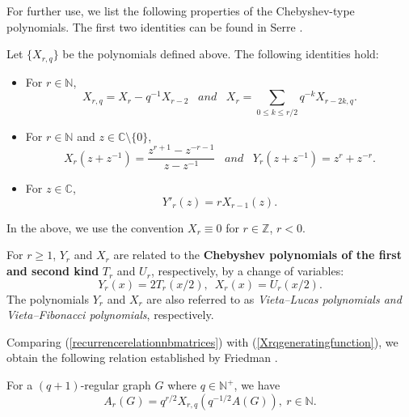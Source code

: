 \documentclass{article}
\begin{document}
For further use, we list the following properties of the Chebyshev-type polynomials. The first two identities can be found in Serre \cite{Ser97}.
\begin{lemma}\label{propertyofcheby}
Let $\{X_{r,q}\}$ be the polynomials defined above. The following identities hold:
\begin{itemize}
    \item [(i)]
    For $r\in \mathbb{N}$,
    \begin{equation}\label{chebyinversehao}
        X_{r,q}=X_r-q^{-1}X_{r-2} \,\,\,\,\,and \,\,\,\,\,X_r=\sum_{0\leq k\leq r/2}q^{-k}X_{r-2k,q}.
    \end{equation}
    
    \item [(ii)]
    For $r\in \mathbb{N}$ and $z\in \mathbb{C}\setminus \{0\}$, 
    \begin{equation}\label{chebyshevexplicit}
        X_{r}(z+z^{-1})=\frac{z^{r+1}-z^{-r-1}}{z-z^{-1}} \,\,\,\,\,and \,\,\,\,\,Y_{r}(z+z^{-1})=z^{r}+z^{-r}.
    \end{equation}

    \item [(iii)] For $z\in \mathbb{C}$,
    \begin{equation} \label{eq:Yrderivative}
        Y'_{r}(z)=r X_{r-1}(z).
    \end{equation}
\end{itemize}
In the above, we use the convention $X_r\equiv 0$ for $r\in \mathbb{Z}$, $r<0$.
\end{lemma}

\begin{remark}
  For $r\geq 1$, $Y_r$ and $X_r$ are related to the \textbf{Chebyshev polynomials of the first and second kind} $T_r$ and $U_r$, respectively, by a change of variables:
   $$Y_r(x)=2T_r(x/2),\,\,\, X_r(x)=U_r(x/2).$$
  The polynomials $Y_r$ and $X_r$ are also referred to as \emph{Vieta–Lucas polynomials and Vieta–Fibonacci polynomials}, respectively. 
\end{remark}

Comparing (\ref{recurrencerelationnbmatrices}) with (\ref{Xrqgeneratingfunction}), we obtain the following relation established by Friedman \cite[Lemma 3.3]{Fri91}.

\begin{lemma}\label{ArandXrq} 
For a $(q+1)$-regular graph $G$ where $q\in \mathbb{N}^+$, we have
\begin{equation}\label{Serrechebyshevmoment}
    A_r(G)=q^{r/2}X_{r,q}(q^{-1/2}A(G)),\ r\in \mathbb{N}.
\end{equation}
\end{lemma}
\end{document}
